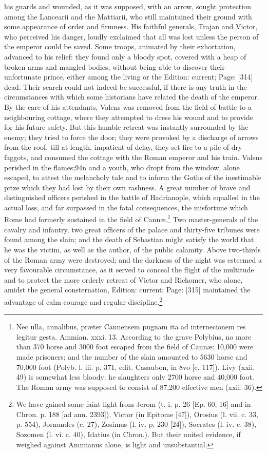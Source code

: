 his guards and wounded, as it was supposed, with an arrow, sought protection among the Lancearii and the Mattiarii, who still maintained their ground with some appearance of order and firmness. His faithful generals, Trajan and Victor, who perceived his danger, loudly exclaimed that all was lost unless the person of the emperor could be saved. Some troops, animated by their exhortation, advanced to his relief: they found only a bloody spot, covered with a heap of broken arms and mangled bodies, without being able to discover their unfortunate prince, either among the living or the Edition: current; Page: [314] dead. Their search could not indeed be successful, if there is any truth in the circumstances with which some historians have related the death of the emperor. By the care of his attendants, Valens was removed from the field of battle to a neighbouring cottage, where they attempted to dress his wound and to provide for his future safety. But this humble retreat was instantly surrounded by the enemy; they tried to force the door; they were provoked by a discharge of arrows from the roof, till at length, impatient of delay, they set fire to a pile of dry faggots, and consumed the cottage with the Roman emperor and his train. Valens perished in the flames;94n and a youth, who dropt from the window, alone escaped, to attest the melancholy tale and to inform the Goths of the inestimable prize which they had lost by their own rashness. A great number of brave and distinguished officers perished in the battle of Hadrianople, which equalled in the actual loss, and far surpassed in the fatal consequences, the misfortune which Rome had formerly sustained in the field of Cannæ.\footnote{Nec ulla, annalibus, præter Cannensem pugnam ita ad internecionem res legitur gesta. Ammian. xxxi. 13. According to the grave Polybius, no more than 370 horse and 3000 foot escaped from the field of Cannæ: 10,000 were made prisoners; and the number of the slain amounted to 5630 horse and 70,000 foot (Polyb. l. iii. p. 371, edit. Casaubon, in 8vo [c. 117]). Livy (xxii. 49) is somewhat less bloody: he slaughters only 2700 horse and 40,000 foot. The Roman army was supposed to consist of 87,200 effective men (xxii. 36).} Two master-generals of the cavalry and infantry, two great officers of the palace and thirty-five tribunes were found among the slain; and the death of Sebastian might satisfy the world that he was the victim, as well as the author, of the public calamity. Above two-thirds of the Roman army were destroyed; and the darkness of the night was esteemed a very favourable circumstance, as it served to conceal the flight of the multitude and to protect the more orderly retreat of Victor and Richomer, who alone, amidst the general consternation, Edition: current; Page: [315] maintained the advantage of calm courage and regular discipline.\footnote{We have gained some faint light from Jerom (t. i. p. 26 [Ep. 60, 16] and in Chron. p. 188 [ad ann. 2393]), Victor (in Epitome [47]), Orosius (l. vii. c. 33, p. 554), Jornandes (c. 27), Zosimus (l. iv. p. 230 [24]), Socrates (l. iv. c. 38), Sozomen (l. vi. c. 40), Idatius (in Chron.). But their united evidence, if weighed against Ammianus alone, is light and unsubstantial.}

